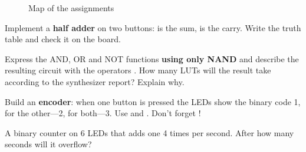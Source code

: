 \begin{figure}[H]
\centering
{}
\caption{Map of the assignments}
\end{figure}

\begin{taskbox}
Implement a \textbf{half adder} on two buttons:  is the sum,
 is the carry. Write the truth table and check it on the board.
\end{taskbox}

\begin{taskbox}
Express the AND, OR and NOT functions \textbf{using only NAND} and describe the
resulting circuit with the operators . How many
LUTs will the result take according to the synthesizer report? Explain why.
\end{taskbox}

\begin{taskbox}
Build an \textbf{encoder}: when one button is pressed the LEDs show the binary
code 1, for the other---2, for both---3. Use
 and . Don't forget !
\end{taskbox}

\begin{taskbox}
A binary counter on 6 LEDs that adds one 4 times per second.
After how many seconds will it overflow?
\end{taskbox}

